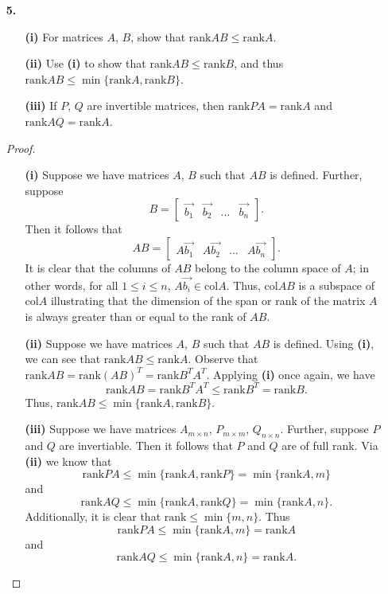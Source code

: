 \documentclass[ 12pt ]{article}
\begin{document}
\begin{enumerate}
	\item[\textbf{5.}]
		\begin{enumerate}
			\item[\textbf{(i)}] For matrices $A$, $B$, show that $\mathrm{rank} AB \leq \mathrm{rank} A$.
			\item[\textbf{(ii)}] Use \textbf{(i)} to show that $\mathrm{rank} AB \leq \mathrm{rank} B$, and thus $\mathrm{rank} AB \leq \min \{ \mathrm{rank} A, \mathrm{rank} B \}$.
			\item[\textbf{(iii)}] If $P$, $Q$ are invertible matrices, then $\mathrm{rank} PA = \mathrm{rank} A$ and $\mathrm{rank} AQ = \mathrm{rank} A$.
		\end{enumerate}

		\begin{proof}
			\begin{enumerate}
				\item[\textbf{(i)}] Suppose we have matrices $A$, $B$ such that $AB$ is defined. Further, suppose $$B = \begin{bmatrix} \vec{b_1} & \vec{b_2} & \hdots & \vec{b_n}
					\end{bmatrix}.$$ Then it follows that $$AB = \begin{bmatrix} A\vec{b_1} & A\vec{b_2} & \hdots & A\vec{b_n} \end{bmatrix}.$$ It is clear that the columns of $AB$
					belong to the column space of $A$; in other words, for all $1 \leq i \leq n$, $A\vec{b_i} \in \mathrm{col} A$. Thus, $\mathrm{col} AB$ is a subspace of
					$\mathrm{col} A$ illustrating that the dimension of the span or rank of the matrix $A$ is always greater than or equal to the rank of $AB$.

				\item[\textbf{(ii)}] Suppose we have matrices $A$, $B$ such that $AB$ is defined. Using \textbf{(i)}, we can see that $\mathrm{rank} AB \leq \mathrm{rank} A$.
					Observe that $\mathrm{rank} AB = \mathrm{rank} (AB)^T = \mathrm{rank} B^T A^T$. Applying \textbf{(i)} once again, we have $$\mathrm{rank} AB =
					\mathrm{rank} B^T A^T \leq \mathrm{rank} B^T = \mathrm{rank} B.$$ Thus, $\mathrm{rank} AB \leq \min \{ \mathrm{rank} A, \mathrm{rank} B\}$.

				\item[\textbf{(iii)}] Suppose we have matrices $A_{m \times n}$, $P_{m \times m}$, $Q_{n \times n}$. Further, suppose $P$ and $Q$ are invertiable. Then it follows that
					$P$ and $Q$ are of full rank. Via \textbf{(ii)} we know that $$\mathrm{rank} PA \leq \min \{ \mathrm{rank} A, \mathrm{rank} P \} = \min \{ \mathrm{rank} A, m \}$$
					and $$\mathrm{rank} AQ \leq \min \{ \mathrm{rank} A, \mathrm{rank} Q \} = \min \{ \mathrm{rank} A, n \}.$$ Additionally, it is clear that $\mathrm{rank} \leq
					\min \{ m, n \}$. Thus $$\mathrm{rank} PA \leq \min \{ \mathrm{rank} A, m \} = \mathrm{rank} A$$ and $$\mathrm{rank} AQ \leq \min \{ \mathrm{rank} A, n \} =
					\mathrm{rank} A.$$
			\end{enumerate}
		\end{proof}



\end{enumerate}
\end{document}
